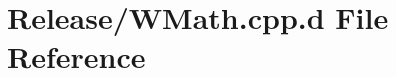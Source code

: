 \hypertarget{_release_2_w_math_8cpp_8d}{\section{\-Release/\-W\-Math.cpp.\-d \-File \-Reference}
\label{_release_2_w_math_8cpp_8d}
}
